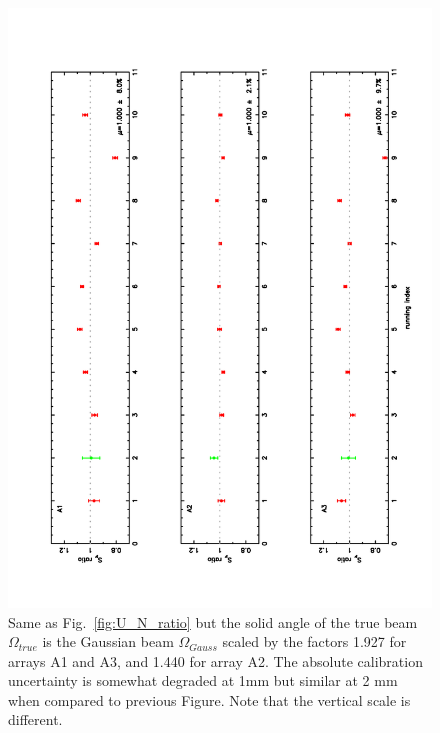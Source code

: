 \begin{figure}
\begin{center}
  \includegraphics[clip, angle=-90, scale=0.6]{Figures/ratio_Ura_Nept_O_fixed.pdf}
  \caption{Same as Fig.~\ref{fig:U_N_ratio} but the solid angle of the true beam  $\Omega_{true}$
    is the  Gaussian beam $\Omega_{Gauss}$ scaled by the factors 1.927 for arrays A1 and A3, and 1.440 for array A2.
    The absolute calibration uncertainty is somewhat degraded at 1mm but similar at 2 mm when compared to previous Figure.
    Note that the vertical scale is different.
   }
\label{fig:U_N_ratio_fixed}
\end{center}
\end{figure}



